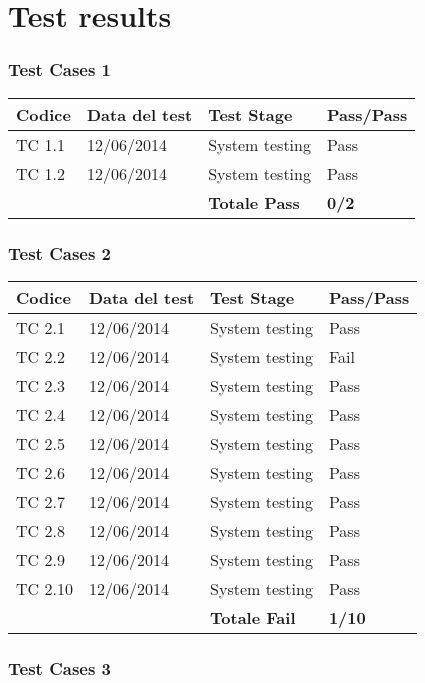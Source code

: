 \chapter{Test results}

\subsection{Test Cases 1}

\begin{tabular}{|p{3cm}|p{3cm}|p{3cm}|p{3cm}|}
	\hline
	\rowcolor{Gray}
	\textbf{Codice} & \textbf{Data del test} & \textbf{Test Stage}  & \textbf{Pass/Pass}\tabularnewline
	\hline
	TC 1.1			& 12/06/2014 			& System testing		& Pass \tabularnewline
	\hline
	TC 1.2			& 12/06/2014 			& System testing		& Pass \tabularnewline
	\hline
					& 						& \textbf{Totale Pass}	& \textbf{0/2} \tabularnewline
	\hline
\end{tabular}

\subsection{Test Cases 2}

\begin{tabular}{|p{3cm}|p{3cm}|p{3cm}|p{3cm}|}
	\hline
	\rowcolor{Gray}
	\textbf{Codice} & \textbf{Data del test} & \textbf{Test Stage} & \textbf{Pass/Pass}\tabularnewline
	\hline
	TC 2.1			& 12/06/2014 			& System testing		& Pass \tabularnewline
	\hline
	TC 2.2			& 12/06/2014 			& System testing		& Fail \tabularnewline
	\hline
	TC 2.3			& 12/06/2014 			& System testing		& Pass \tabularnewline
	\hline
	TC 2.4			& 12/06/2014 			& System testing		& Pass \tabularnewline
	\hline
	TC 2.5			& 12/06/2014 			& System testing		& Pass \tabularnewline
	\hline
	TC 2.6			& 12/06/2014 			& System testing		& Pass \tabularnewline
	\hline
	TC 2.7			& 12/06/2014 			& System testing		& Pass \tabularnewline
	\hline
	TC 2.8			& 12/06/2014 			& System testing		& Pass \tabularnewline
	\hline
	TC 2.9			& 12/06/2014 			& System testing		& Pass \tabularnewline
	\hline
	TC 2.10			& 12/06/2014 			& System testing		& Pass \tabularnewline
	\hline
					& 						& \textbf{Totale Fail}	& \textbf{1/10} \tabularnewline
	\hline
\end{tabular}

\subsection{Test Cases 3}

